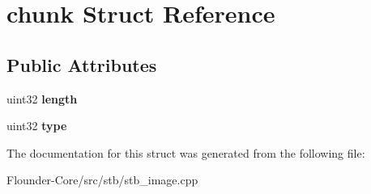 \hypertarget{structchunk}{}\section{chunk Struct Reference}
\label{structchunk}
\subsection*{Public Attributes}
\begin{DoxyCompactItemize}
\item 
\mbox{\label{structchunk_a0b5cc0c5a9b91945c42373db2a499fb1}} 
uint32 {\bfseries length}
\item 
\mbox{\label{structchunk_a05d5489f3807bc7ba149c1904241d087}} 
uint32 {\bfseries type}
\end{DoxyCompactItemize}


The documentation for this struct was generated from the following file\+:\begin{DoxyCompactItemize}
\item 
Flounder-\/\+Core/src/stb/stb\+\_\+image.\+cpp\end{DoxyCompactItemize}
